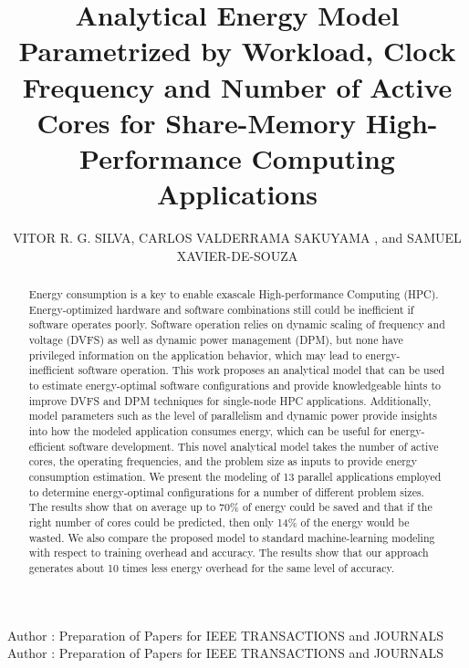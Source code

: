 \documentclass{ieeeaccess}
\begin{document}

\title{
Analytical Energy Model Parametrized by Workload, Clock Frequency and Number of Active Cores for Share-Memory High-Performance Computing Applications
}

\author{
\uppercase{Vitor R. G. Silva},
\uppercase{Carlos Valderrama Sakuyama} , and \uppercase{Samuel Xavier-de-Souza} }
\address[1]{Department of Electronics and Microelectronics (SEMi), University of Mons, 7000 Mons, Belgium}
\address[2]{Department of Computer Engineering and Automation, Universidade Federal do Rio Grande do Norte, Natal, Brazil}

\markboth
{Author \headeretal: Preparation of Papers for IEEE TRANSACTIONS and JOURNALS}
{Author \headeretal: Preparation of Papers for IEEE TRANSACTIONS and JOURNALS}


\begin{abstract}
Energy consumption is a key to enable exascale High-performance Computing (HPC). Energy-optimized hardware and software combinations still could be inefficient if software operates poorly. 
Software operation relies on dynamic scaling of frequency and voltage (DVFS) as well as dynamic power management (DPM), but none have privileged information on the application behavior, which may lead to energy-inefficient software operation. 
This work proposes an analytical model that can be used to estimate energy-optimal software configurations and provide knowledgeable hints to improve DVFS and DPM techniques for single-node HPC applications. 
Additionally, model parameters such as the level of parallelism and dynamic power provide insights into how the modeled application consumes energy, which can be useful for energy-efficient software development.
This novel analytical model takes the number of active cores, the operating frequencies, and the problem size as inputs to provide energy consumption estimation.
We present the modeling of 13 parallel applications employed to determine energy-optimal configurations for a number of different problem sizes. 
The results show that on average up to 70\% of energy could be saved and that if the right number of cores could be predicted, then only 14\% of the energy would be wasted.
We also compare the proposed model to standard machine-learning modeling with respect to training overhead and accuracy. The results show that our approach generates about 10 times less energy overhead for the same level of accuracy.
\end{abstract}
\end{document}
